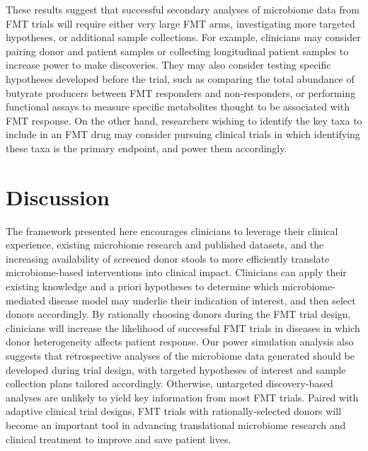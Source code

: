 These results suggest that successful secondary analyses of microbiome data from FMT trials will require either very large FMT arms, investigating more targeted hypotheses, or additional sample collections.
For example, clinicians may consider pairing donor and patient samples or collecting longitudinal patient samples to increase power to make discoveries.
They may also consider testing specific hypotheses developed before the trial, such as comparing the total abundance of butyrate producers between FMT responders and non-responders, or performing functional assays to measure specific metabolites thought to be associated with FMT response.
On the other hand, researchers wishing to identify the key taxa to include in an FMT drug may consider pursuing clinical trials in which identifying these taxa is the primary endpoint, and power them accordingly.

\section{Discussion}

The framework presented here encourages clinicians to leverage their clinical experience, existing microbiome research and published datasets, and the increasing availability of screened donor stools to more efficiently translate microbiome-based interventions into clinical impact.
Clinicians can apply their existing knowledge and a priori hypotheses to determine which microbiome-mediated disease model may underlie their indication of interest, and then select donors accordingly.
By rationally choosing donors during the FMT trial design, clinicians will increase the likelihood of successful FMT trials in diseases in which donor heterogeneity affects patient response.
Our power simulation analysis also suggests that retrospective analyses of the microbiome data generated should be developed during trial design, with targeted hypotheses of interest and sample collection plans tailored accordingly.
Otherwise, untargeted discovery-based analyses are unlikely to yield key information from most FMT trials.
Paired with adaptive clinical trial designs, FMT trials with rationally-selected donors will become an important tool in advancing translational microbiome research and clinical treatment to improve and save patient lives.

